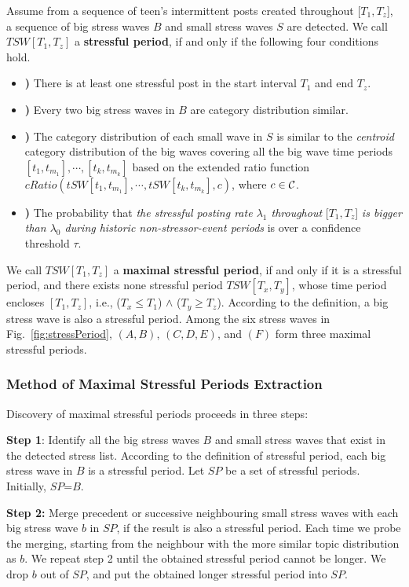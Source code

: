 Assume from a sequence of teen's intermittent posts created throughout [$T_1,T_z$], a sequence of big stress waves $B$
and small stress waves $S$
are detected.
We call $TSW[T_1,T_z]$ a \textbf{stressful period}, if and only if the following four conditions hold.\\
\begin{itemize}
\item \textbf{)} There is at least one stressful post in the start interval $T_1$ and end $T_z$.
\item \textbf{)} Every two big stress waves in $B$ are category distribution similar.
\item \textbf{)} The category distribution of each small wave in $S$ is similar to the \emph{centroid} category distribution of the big waves covering all the big wave time periods $[t_1,t_{m_1}], \cdots, [t_k,t_{m_k}]$ based on the extended ratio function $cRatio(tSW[t_1,t_{m_1}], \cdots, tSW[t_k,t_{m_k}],c)$, where $c \in {\cal C}$.
\item \textbf{)} The probability that \emph{the stressful posting rate $\lambda_1$ throughout} [$T_1,T_z$] \emph{is bigger than $\lambda_0$ during historic non-stressor-event periods} is over a confidence threshold $\tau$.
\end{itemize}

We call $TSW[T_1,T_z]$ a \textbf{maximal stressful period}, if and only if it
is a stressful period, and there exists none stressful period $TSW[T_x,T_y]$, whose time period encloses
$[T_1,T_z]$, i.e., ($T_x \leq T_1$) $\wedge$ ($T_y \geq T_z$).
According to the definition, a big stress wave is also a stressful period.
Among the six stress waves in Fig.~\ref{fig:stressPeriod}, $(A,B)$, $(C,D,E)$, and $(F)$ form three maximal stressful periods.

\subsubsection{Method of Maximal Stressful Periods Extraction}

Discovery of maximal stressful periods proceeds in three steps:

\textbf{Step 1}: Identify all the big stress waves $B$ and small stress waves that exist in the detected stress list.
According to the definition of stressful period, each big stress wave in $B$ is a stressful period.
Let $SP$ be a set of stressful periods.
Initially, $SP$=$B$.

\textbf{Step 2:} Merge precedent or successive neighbouring small stress waves with each big stress wave $b$ in $SP$,
if the result is also a stressful period.
Each time we probe the merging, starting from the neighbour with the more similar
topic distribution as $b$. We repeat step 2 until the obtained stressful period cannot be longer.
We drop $b$ out of $SP$, and put the obtained longer stressful period into $SP$.

